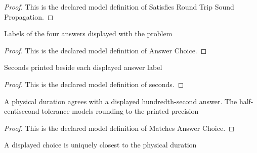 \begin{proof}
  This is the declared model definition of Satisfies Round Trip Sound Propagation.
\end{proof}
\begin{definition}
  \label{def:physics:phyx-mini-0201:phyxminiproblems-problemphyxmini0201-answerchoice}
  Labels of the four answers displayed with the problem
\end{definition}
\begin{proof}
  This is the declared model definition of Answer Choice.
\end{proof}
\begin{definition}[seconds]
  \label{def:physics:phyx-mini-0201:phyxminiproblems-problemphyxmini0201-answerchoice-seconds}
  Seconds printed beside each displayed answer label
\end{definition}
\begin{proof}
  This is the declared model definition of seconds.
\end{proof}
\begin{definition}
  \label{def:physics:phyx-mini-0201:phyxminiproblems-problemphyxmini0201-matchesanswerchoice}
  A physical duration agrees with a displayed hundredth-second answer. The half-centisecond tolerance models rounding to the printed precision
\end{definition}
\begin{proof}
  This is the declared model definition of Matches Answer Choice.
\end{proof}
\begin{definition}
  \label{def:physics:phyx-mini-0201:phyxminiproblems-problemphyxmini0201-isclosestanswerchoice}
  A displayed choice is uniquely closest to the physical duration
\end{definition}
